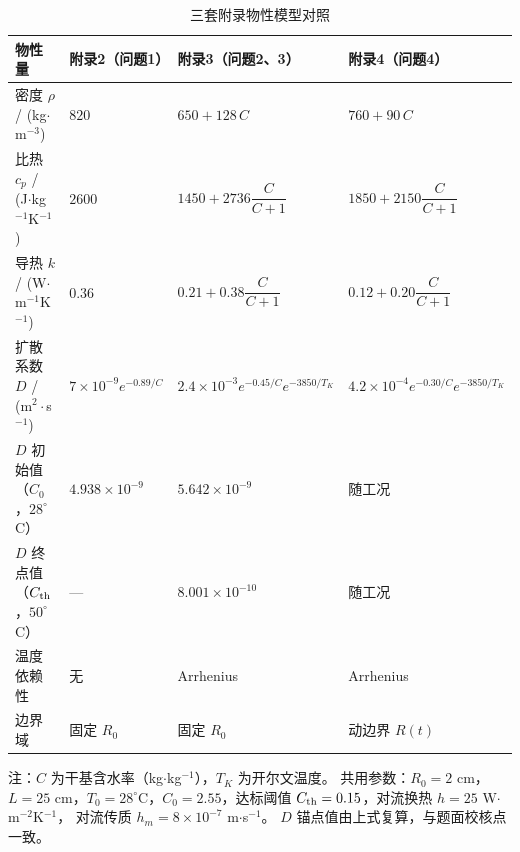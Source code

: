 \begin{table}[H]
  \centering
  \caption{三套附录物性模型对照}
  \label{tab:properties}
  \small
  \begin{tabular}{llll}
    \toprule
    物性量 & 附录2（问题1） & 附录3（问题2、3） & 附录4（问题4） \\
    \midrule
    密度 $\rho$ / (kg$\cdot$m$^{-3}$)
      & $820$
      & $650+128\,C$
      & $760+90\,C$ \\
    比热 $c_p$ / (J$\cdot$kg$^{-1}$K$^{-1}$)
      & $2600$
      & $1450+2736\dfrac{C}{C+1}$
      & $1850+2150\dfrac{C}{C+1}$ \\
    导热 $k$ / (W$\cdot$m$^{-1}$K$^{-1}$)
      & $0.36$
      & $0.21+0.38\dfrac{C}{C+1}$
      & $0.12+0.20\dfrac{C}{C+1}$ \\
    扩散系数 $D$ / (m$^2\cdot$s$^{-1}$)
      & $7{\times}10^{-9}e^{-0.89/C}$
      & $2.4{\times}10^{-3}e^{-0.45/C}e^{-3850/T_K}$
      & $4.2{\times}10^{-4}e^{-0.30/C}e^{-3850/T_K}$ \\
    \midrule
    $D$ 初始值（$C_0$，$28^\circ$C）
      & $4.938{\times}10^{-9}$
      & $5.642{\times}10^{-9}$
      & 随工况 \\
    $D$ 终点值（$C_{\rm th}$，$50^\circ$C）
      & ---
      & $8.001{\times}10^{-10}$
      & 随工况 \\
    温度依赖性
      & 无
      & Arrhenius
      & Arrhenius \\
    边界域
      & 固定 $R_0$
      & 固定 $R_0$
      & 动边界 $R(t)$ \\
    \bottomrule
  \end{tabular}

  \vspace{2pt}
  \parbox{0.94\linewidth}{\footnotesize
  注：$C$ 为干基含水率（kg$\cdot$kg$^{-1}$），$T_K$ 为开尔文温度。
  共用参数：$R_0=2$ cm，$L=25$ cm，$T_0=28^\circ$C，$C_0=2.55$，达标阈值
  $C_{\rm th}=0.15$，对流换热 $h=25$ W$\cdot$m$^{-2}$K$^{-1}$，
  对流传质 $h_m=8{\times}10^{-7}$ m$\cdot$s$^{-1}$。
  $D$ 锚点值由上式复算，与题面校核点一致。}
\end{table}
